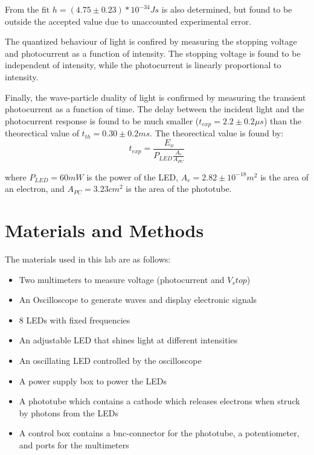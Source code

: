 \documentclass[12pt,twocolumn]{article}
\begin{document}
From the fit $h = (4.75\pm0.23)*10^{-34} Js$ is also determined, but found to be outside the accepted value due to unaccounted experimental error.

The quantized behaviour of light is confired by measuring the stopping voltage and photocurrent as a function of intensity. The stopping voltage is found to be independent of intensity, while the photocurrent is linearly proportional to intensity.

Finally, the wave-particle duality of light is confirmed by measuring the transient photocurrent as a function of time. The delay between the incident light and the photocurrent response is found to be much smaller ($t_{exp} = 2.2 \pm 0.2 \mu s$) than the theorectical value of $t_{th} = 0.30 \pm 0.2 ms$. The theorectical value is found by:
\begin{equation}
    t_{exp} = \frac{E_o}{P_{LED}\frac{A_e}{A_{PC}}}
    \label{eq:delay}
\end{equation}

where $P_{LED} = 60 mW$ is the power of the LED, $A_e = 2.82 \pm 10^{-18}m^2$ is the area of an electron, and $A_{PC} = 3.23{cm}^2$ is the area of the phototube.

\section{Materials and Methods}

The materials used in this lab are as follows:
\begin{itemize}
    \item Two multimeters to measure voltage (photocurrent and $V_stop$)
    \item An Oscilloscope to generate waves and display electronic signals
    \item 8 LEDs with fixed frequencies
    \item An adjustable LED that shines light at different intensities 
    \item An oscillating LED controlled by the oscilloscope
    \item A power supply box to power the LEDs
    \item A phototube which contains a cathode which releases electrons when struck by photons from the LEDs
    \item A control box contains a bnc-connector for the phototube, a potentiometer, and ports for the multimeters
\end{itemize}
\end{document}
